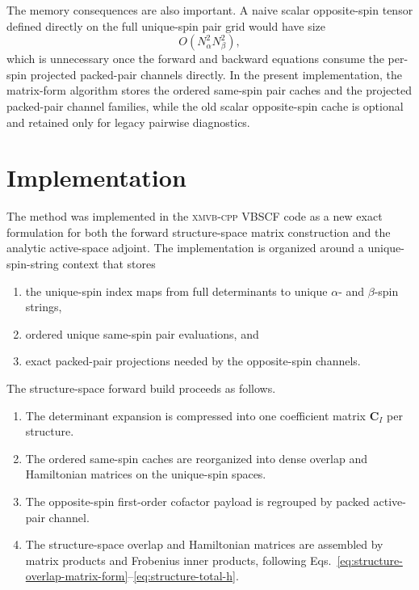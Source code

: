 \documentclass[journal=jctcce,manuscript=article]{achemso}
\newcommand{\na}{N_{\alpha}}
\newcommand{\nb}{N_{\beta}}
\newcommand{\Cmat}{\mathbf{C}}
\begin{document}
The memory consequences are also important. A naive scalar opposite-spin tensor
defined directly on the full unique-spin pair grid would have size
\begin{equation}
O(\na^2 \nb^2),
\label{eq:old-op-cache}
\end{equation}
which is unnecessary once the forward and backward equations consume the
per-spin projected packed-pair channels directly. In the present
implementation, the matrix-form algorithm stores the ordered same-spin
pair caches and the projected packed-pair channel families, while the old
scalar opposite-spin cache is optional and retained only for legacy pairwise
diagnostics.

\section{Implementation}
The method was implemented in the \textsc{xmvb-cpp} VBSCF code as a new exact
formulation for both the forward structure-space matrix construction and the
analytic active-space adjoint. The implementation is organized around a
unique-spin-string context that stores
\begin{enumerate}
  \item the unique-spin index maps from full determinants to unique $\alpha$-
        and
        $\beta$-spin strings,
  \item ordered unique same-spin pair evaluations, and
  \item exact packed-pair projections needed by the opposite-spin channels.
\end{enumerate}

The structure-space forward build proceeds as follows.
\begin{enumerate}
  \item The determinant expansion is compressed into one coefficient matrix
        $\Cmat_I$ per structure.
  \item The ordered same-spin caches are reorganized into dense overlap and
        Hamiltonian matrices on the unique-spin spaces.
  \item The opposite-spin first-order cofactor payload is regrouped by packed
        active-pair channel.
  \item The structure-space overlap and Hamiltonian matrices are assembled by
        matrix products and Frobenius inner products, following
        Eqs.~\eqref{eq:structure-overlap-matrix-form}--\eqref{eq:structure-total-h}.
\end{enumerate}
\end{document}
